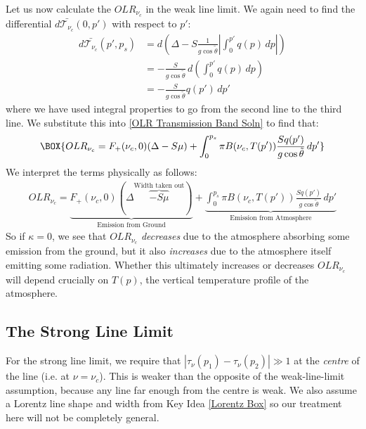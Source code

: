 Let us now calculate the $OLR_{\nu_c}$ in the weak line limit. We again need to find the differential $d\bar{\mathcal{T}_{\nu_c}}(0,p')$ with respect to $p'$:
\begin{align*}
    d\bar{\mathcal{T}_{\nu_c}}(p',p_s)&=d\left( 
        \Delta - S\frac{1}{g\cos\tilde{\theta}}\left|
            \int_{0}^{p'}q(p)\,dp
        \right|
     \right)\\
     &= -\frac{S}{g\cos\tilde{\theta}}\,d\left( 
        \int_{0}^{p'}q(p)\,dp
      \right)
     \\
     &= -\frac{S}{g\cos\tilde{\theta}}q(p')\,dp'
\end{align*}
where we have used integral properties to go from the second line to the third line. We substitute this into \ref{OLR Transmission Band Soln} to find that: 
\begin{align}
    \BOX{OLR_{\nu_c}
    =F_+(\nu_c,0)(\Delta-S\mu)+\int_{0}^{p_s}\pi B(\nu_c,T(p'))\frac{Sq(p')}{g\cos\tilde{\theta}}\,dp'}
\end{align}
We interpret the terms physically as follows:
\begin{align*}
    OLR_{\nu_c}
    =\underbrace{F_+(\nu_c,0)(\Delta\overbrace{-S\mu}^{\text{Width taken out}})}_{\text{Emission from Ground}}
    +\underbrace{\int_{0}^{p_s}\pi B(\nu_c,T(p'))\frac{Sq(p')}{g\cos\tilde{\theta}}\,dp'}_{\text{Emission from Atmosphere}}
\end{align*}
So if $\kappa=0$, we see that $OLR_{\nu_c}$ \textit{decreases} due to the atmosphere absorbing some emission from the ground, but it also \textit{increases} due to the atmosphere itself emitting some radiation. Whether this ultimately increases or decreases $OLR_{\nu_c}$ will depend crucially on $T(p)$, the vertical temperature profile of the atmosphere.

\subsection{The Strong Line Limit}

For the strong line limit, we require that $|\tau_\nu(p_1)-\tau_\nu(p_2)|\gg 1$ at the \textit{centre} of the line (i.e. at $\nu=\nu_c$). This is weaker than the opposite of the weak-line-limit assumption, because any line far enough from the centre is weak. We also assume a Lorentz line shape and width from Key Idea \ref{Lorentz Box} so our treatment here will not be completely general.


